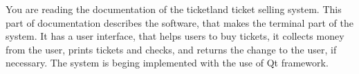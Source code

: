 You are reading the documentation of the ticketland ticket selling system. This part of documentation describes the software, that makes the terminal part of the system. It has a user interface, that helps users to buy tickets, it collects money from the user, prints tickets and checks, and returns the change to the user, if necessary. The system is beging implemented with the use of Qt framework. 